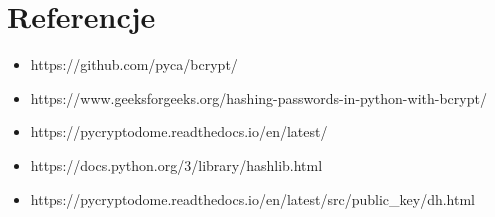 \documentclass[options]{article}
\begin{document}
\section*{Referencje}
\begin{itemize}
    \item https://github.com/pyca/bcrypt/
    \item https://www.geeksforgeeks.org/hashing-passwords-in-python-with-bcrypt/
    \item https://pycryptodome.readthedocs.io/en/latest/
    \item https://docs.python.org/3/library/hashlib.html
    \item https://pycryptodome.readthedocs.io/en/latest/src/public_key/dh.html
\end{itemize}
\end{document}
